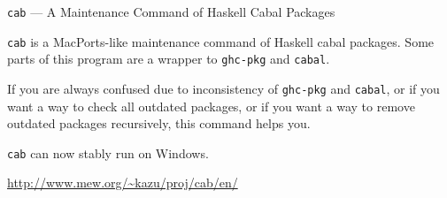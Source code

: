 \begin{hcarentry}[updated]{{\tt cab} --- A Maintenance Command of Haskell Cabal Packages}
\makeheader

{\tt cab} is a MacPorts-like maintenance command of Haskell cabal packages. Some parts of this program are a wrapper to {\tt ghc-pkg} and {\tt cabal}.

If you are always confused due to inconsistency of {\tt ghc-pkg} and {\tt cabal}, or if you want a way to check all outdated packages, or if you want a way to remove outdated packages recursively, this command helps you.

{\tt cab} can now stably run on Windows.

\FurtherReading
  \url{http://www.mew.org/~kazu/proj/cab/en/}
\end{hcarentry}
